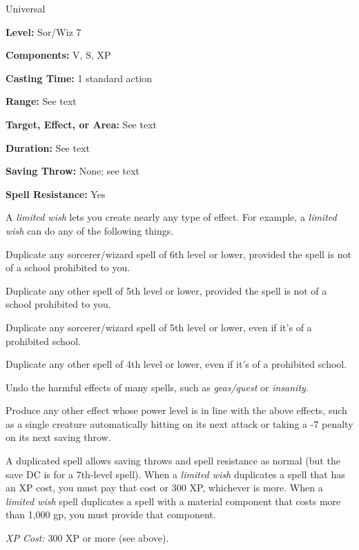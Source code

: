 
Universal

\textbf{Level:} Sor/Wiz 7

\textbf{Components:} V, S, XP

\textbf{Casting Time:} 1 standard action

\textbf{Range:} See text

\textbf{Target, Effect, or Area:} See text

\textbf{Duration:} See text

\textbf{Saving Throw:} None; see text

\textbf{Spell Resistance:} Yes

A \textit{limited wish} lets you create nearly any type of effect. For example, 
a \textit{limited wish} can do any of the following things.%

Duplicate any sorcerer/wizard spell of 6th level or lower, provided the spell is 
not of a school prohibited to you.%

Duplicate any other spell of 5th level or lower, provided the spell is not of a 
school prohibited to you.%

Duplicate any sorcerer/wizard spell of 5th level or lower, even if it's of a prohibited 
school.%

Duplicate any other spell of 4th level or lower, even if it's of a prohibited school.%

Undo the harmful effects of many spells, such as \textit{geas/quest} or \textit{insanity}.%

Produce any other effect whose power level is in line with the above effects, such 
as a single creature automatically hitting on its next attack or taking a -7 penalty 
on its next saving throw.

A duplicated spell allows saving throws and spell resistance as normal (but the 
save DC is for a 7th-level spell). When a \textit{limited wish} duplicates a spell 
that has an XP cost, you must pay that cost or 300 XP, whichever is more. When 
a \textit{limited wish} spell duplicates a spell with a material component that 
costs more than 1,000 gp, you must provide that component.

\textit{XP Cost:} 300 XP or more (see above).

